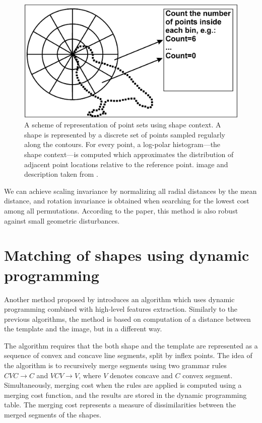\begin{figure}
\centering
\includegraphics[width=\linewidth]{ext/polarbins.png}
\caption{A scheme of representation of point sets using shape context.
A shape is represented by a discrete set of points sampled regularly along
the contours. For every point, a log-polar histogram—the shape context—is
computed which approximates the distribution of adjacent point locations
relative to the reference point. image and description taken from \citet{simple}.}
\label{fig:polarbins}
\end{figure}

We can achieve scaling invariance by normalizing all radial distances by the mean distance, and rotation invariance is obtained when searching for the lowest cost among all permutations. According to the paper, this method is also robust against small geometric disturbances.

\section{Matching of shapes using dynamic programming}

Another method proposed by \citet{convex} introduces an algorithm which uses dynamic programming combined with high-level features extraction. Similarly to the previous algorithms, the method is based on computation of a distance between the template and the image, but in a different way.

The algorithm requires that the both shape and the template are represented as a sequence of convex and concave line segments, split by inflex points. The idea of the algorithm is to recursively merge segments using two grammar rules $CVC \to C$ and $VCV \to V$, where $V$ denotes concave and $C$ convex segment. Simultaneously, merging cost when the rules are applied is computed using a merging cost function, and the results are stored in the dynamic programming table. The merging cost represents a measure of dissimilarities between the merged segments of the shapes.

